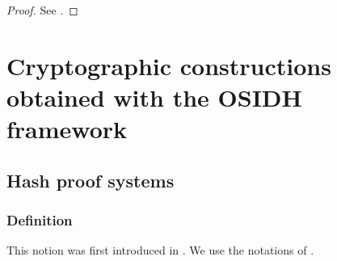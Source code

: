 \documentclass[a4paper,10pt]{report}
\theoremstyle{definition}
\theoremstyle{plain}
\theoremstyle{definition}
\renewcommand{\(}{\left(}
\renewcommand{\)}{\right)}
\begin{document}
\begin{proof}
See \cite[theorem 7.1]{Kuperberg}.
\end{proof}

\chapter{Cryptographic constructions obtained with the OSIDH framework}\label{appendix C}

\section{Hash proof systems}

\subsection{Definition}

This notion was first introduced in \cite{Cramer_Shoup}. We use the notations of \cite{DeFeo1}.
\end{document}
